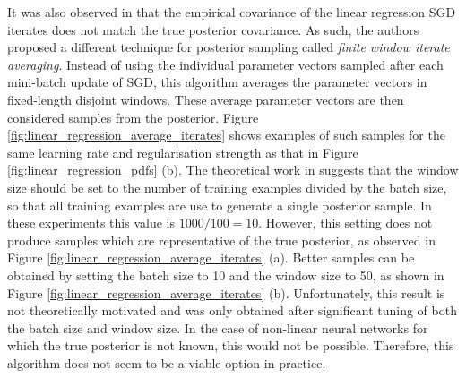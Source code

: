 \documentclass[msc,deptreport.inf]{infthesis} %
\begin{document}
It was also observed in \cite{mandt2017} that the empirical covariance of the linear regression SGD iterates does not match the true posterior covariance. As such, the authors proposed a different technique for posterior sampling called \emph{finite window iterate averaging}. Instead of using the individual parameter vectors sampled after each mini-batch update of SGD, this algorithm averages the parameter vectors in fixed-length disjoint windows. These average parameter vectors are then considered samples from the posterior. Figure \ref{fig:linear_regression_average_iterates} shows examples of such samples for the same learning rate and regularisation strength as that in Figure \ref{fig:linear_regression_pdfs} (b). The theoretical work in \cite{mandt2017} suggests that the window size should be set to the number of training examples divided by the batch size, so that all training examples are use to generate a single posterior sample. In these experiments this value is $1000 / 100 = 10$. However, this setting does not produce samples which are representative of the true posterior, as observed in Figure \ref{fig:linear_regression_average_iterates} (a). Better samples can be obtained by setting the batch size to 10 and the window size to 50, as shown in Figure \ref{fig:linear_regression_average_iterates} (b). Unfortunately, this result is not theoretically motivated and was only obtained after significant tuning of both the batch size and window size. In the case of non-linear neural networks for which the true posterior is not known, this would not be possible. Therefore, this algorithm does not seem to be a viable option in practice. 
\end{document}
